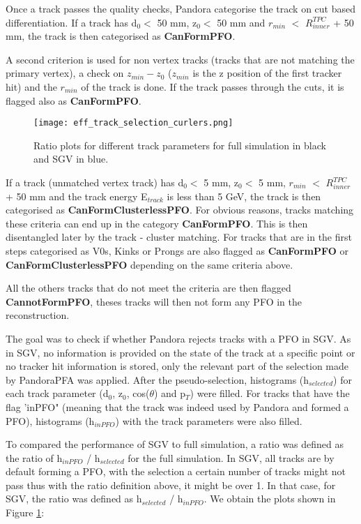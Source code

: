 \documentclass[a4paper,12pt]{article}
\begin{document}
Once a track passes the quality checks, Pandora categorise the track on cut based differentiation. If a track has  d$_0 <$ 50 mm, z$_0 <$ 50 mm and $r_{min}$  $<$ $R^{TPC}_{inner}$ + 50 mm, the track is then categorised as \textbf{CanFormPFO}. 

A second criterion is used for non vertex tracks (tracks that are not matching the primary vertex), a check on $z_{min} - z_0$ ($z_{min}$ is the z position of the first tracker hit) and the $r_{min}$ of the track is done. If the track passes through the cuts, it is flagged also as \textbf{CanFormPFO}. 

\begin{figure}[!h]
   \centering
    \texttt{[image: eff\_track\_selection\_curlers.png]} 
      \caption{Ratio plots for different track parameters for full simulation in black and SGV in blue.}
   \label{fig:trk_select_wcurlers}
\end{figure}

If a track (unmatched vertex track) has d$_0 <$ 5 mm, z$_0 <$ 5 mm, $r_{min}$  $<$ $R^{TPC}_{inner}$ + 50 mm and the track energy E$_{track}$ is less than 5 GeV, the track is then categorised as \textbf{CanFormClusterlessPFO}. For obvious reasons, tracks matching these criteria can end up in the category \textbf{CanFormPFO}. This is then disentangled later by the track - cluster matching. 
For tracks that are in the first steps categorised as V0s, Kinks or Prongs are also flagged as \textbf{CanFormPFO} or \textbf{CanFormClusterlessPFO} depending on the same criteria above.

All the others tracks that do not meet the criteria are then flagged \textbf{CannotFormPFO}, theses tracks will then not form any PFO in the reconstruction.

The goal was to check if whether Pandora rejects tracks with a PFO in SGV. As in SGV, no information is provided on the state of the track at a specific point or no tracker hit information is stored, only the relevant part of the selection made by PandoraPFA was applied. After the pseudo-selection, histograms (h$_{selected}$) for each track parameter (d$_0$, z$_0$, cos($\theta$) and p$_T$) were filled. For tracks that have the flag 'inPFO" (meaning that the track was indeed used by Pandora and formed a PFO), histograms (h$_{inPFO}$) with the track parameters were also filled.

To compared the performance of SGV to full simulation, a ratio was defined as the ratio of h$_{inPFO}$ / h$_{selected}$ for the full simulation. In SGV, all tracks are by default forming a PFO, with the selection a certain number of tracks might not pass thus with the ratio definition above, it might be over 1. In that case, for SGV, the ratio was defined as h$_{selected}$ / h$_{inPFO}$.
We obtain the plots shown in Figure \ref{fig:trk_select_wcurlers}:
\end{document}
